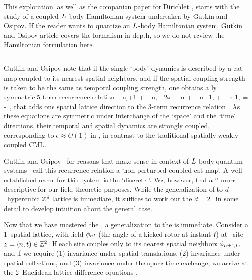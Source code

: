 This exploration, as well as the companion paper for
Dirichlet \bcs, starts with the study of a coupled ${L_{}}$-body
Hamiltonian system undertaken by Gutkin and Osipov. If the
reader wants to quantize an ${L_{}}$-body Hamiltonian system, Gutkin and Osipov
article covers the formalism in depth, so we do not review the
Hamiltonian formulation here.

\subsection{\catLatt}
\label{s:catLatt}

Gutkin and Osipov note that if the single `body' dynamics is described by
a cat map coupled to its nearest spatial neighbors, and if the spatial
coupling strength is taken to be the same as temporal coupling strength,
one obtains a {\spt}ly symmetric 5-term recurrence relation
\beq
       \ssp_{n,\zeit+1} + \ssp_{n,}
- 2{s} \, \ssp_{n\zeit}
     + \ssp_{n+1,\zeit} + \ssp_{n-1, \zeit}
     = -
\,,
that adds one spatial lattice direction to  the {\templatt} 3-term
recurrence relation . As these equations are
symmetric under interchange of the `space' and the `time' directions,
their temporal and spatial dynamics are strongly coupled, corresponding to $\epsilon
\approx O(1)$ in , in contrast to the traditional
spatially weakly coupled CML.

Gutkin and Osipov --for reasons that make sense in context of ${L_{}}$-body
quantum systems-- call this recurrence relation a `non-perturbed coupled
cat map'. A well-established name for this system is
the `discrete {\sPe}'. We, however, find a `\catlatt' more descriptive
for our field-theoretic purposes.
While the generalization of  to $d$\dmn\ hypercubic
$\mathbb{Z}^d$ lattice is immediate, it suffices to work out the $d=2$
\catlatt\ in some detail to develop intuition about the general case.

Now that we have mastered the {\em \templatt} , a
generalization to the {\em \catlatt}  is
immediate. Consider a 1\dmn\ spatial lattice, with field $\phi_{nt}$
(the angle of a kicked rotor  at instant $t$) at
\spt\ site $z=(n,t)\in\mathbb{Z}^2$. If each site couples only to its
nearest spatial neighbors $\phi_{n\pm1,t}$, and if we require
(1) invariance under spatial translations,
(2) invariance under spatial reflections, and
(3) invariance under the space-time exchange,
we arrive at the 2\dmn\ Euclidean lattice difference equations
.

